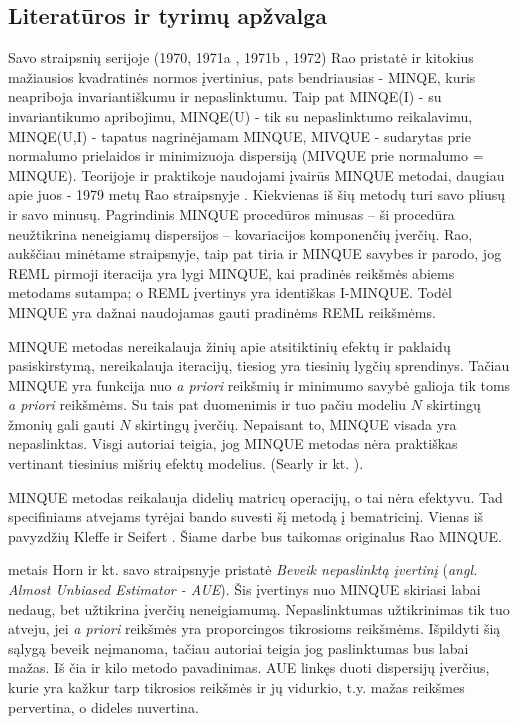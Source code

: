 \documentclass[11pt,a4paper]{article}
\begin{document}
\subsection{Literatūros ir tyrimų apžvalga}

\indent Savo straipsnių serijoje (1970\cite{rao1970}, 1971a\cite{rao1971a} , 1971b\cite{rao1971b} , 1972\cite{rao1972}) Rao pristatė ir kitokius mažiausios kvadratinės normos įvertinius, pats bendriausias - MINQE, kuris neapriboja invariantiškumu ir nepaslinktumu. Taip pat MINQE(I) - su invariantikumo apribojimu, MINQE(U) - tik su nepaslinktumo reikalavimu, MINQE(U,I) - tapatus nagrinėjamam MINQUE, MIVQUE - sudarytas prie normalumo prielaidos ir minimizuoja dispersiją (MIVQUE prie normalumo = MINQUE). Teorijoje ir praktikoje naudojami įvairūs MINQUE metodai, daugiau apie juos - 1979 metų Rao straipsnyje \cite{minquereml3}. Kiekvienas iš šių metodų turi savo pliusų ir savo minusų. Pagrindinis MINQUE procedūros minusas -- ši procedūra neužtikrina neneigiamų dispersijos -- kovariacijos komponenčių įverčių. Rao, aukščiau minėtame straipsnyje, taip pat tiria ir MINQUE savybes ir parodo, jog REML pirmoji iteracija yra lygi MINQUE, kai pradinės reikšmės abiems metodams sutampa; o REML įvertinys yra identiškas I-MINQUE. Todėl MINQUE yra dažnai naudojamas gauti pradinėms REML reikšmėms.

\indent MINQUE metodas nereikalauja žinių apie atsitiktinių efektų ir paklaidų pasiskirstymą, nereikalauja iteracijų, tiesiog yra tiesinių lygčių sprendinys. Tačiau MINQUE yra funkcija nuo \textit{a priori} reikšmių ir minimumo savybė galioja tik toms \textit{a priori} reikšmėms. Su tais pat duomenimis ir tuo pačiu modeliu $N$ skirtingų žmonių gali gauti $N$ skirtingų įverčių. Nepaisant to, MINQUE visada yra nepaslinktas. Visgi autoriai teigia, jog MINQUE metodas nėra praktiškas vertinant tiesinius mišrių efektų modelius. (Searly ir kt. \cite{minquereml2}).

\indent  MINQUE metodas reikalauja didelių matricų operacijų, o tai nėra efektyvu. Tad specifiniams atvejams tyrėjai bando suvesti šį metodą į bematricinį. Vienas iš pavyzdžių Kleffe ir Seifert \cite{papminque}. Šiame darbe bus taikomas originalus Rao MINQUE.

 metais Horn ir kt. savo straipsnyje \cite{AUE} pristatė \textit{Beveik nepaslinktą įvertinį} (\textit{angl. Almost Unbiased Estimator - AUE}). Šis įvertinys nuo MINQUE skiriasi labai nedaug, bet užtikrina įverčių neneigiamumą. Nepaslinktumas užtikrinimas tik tuo atveju, jei \textit{a priori} reikšmės yra proporcingos tikrosioms reikšmėms. Išpildyti šią sąlygą beveik neįmanoma, tačiau autoriai teigia jog paslinktumas bus labai mažas. Iš čia ir kilo metodo pavadinimas. AUE linkęs duoti dispersijų įverčius, kurie yra kažkur tarp tikrosios reikšmės ir jų vidurkio, t.y. mažas reikšmes pervertina, o dideles nuvertina.
\end{document}
